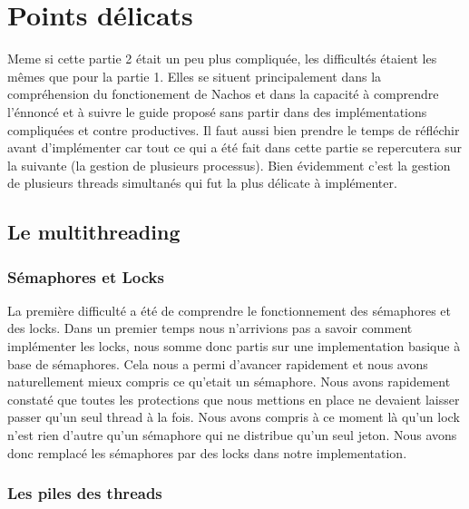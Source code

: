 \documentclass[12pt]{article}
\begin{document}
\section {Points délicats}

Meme si cette partie 2 était un peu plus compliquée, les difficultés étaient les mêmes
que pour la partie 1. Elles se situent principalement dans la compréhension du fonctionement
de Nachos et dans la capacité à comprendre l'énnoncé et à suivre le guide proposé sans
partir dans des implémentations compliquées et contre productives. Il faut aussi
bien prendre le temps de réfléchir avant d'implémenter car tout ce qui a été fait dans
cette partie se repercutera sur la suivante (la gestion de plusieurs processus).
\newline
Bien évidemment c'est la gestion de plusieurs threads simultanés qui fut la plus délicate
à implémenter.

\subsection{Le multithreading}
\subsubsection{Sémaphores et Locks}
La première difficulté a été de comprendre le fonctionnement des sémaphores et des locks.
Dans un premier temps nous n'arrivions pas a savoir comment implémenter les locks, nous somme
donc partis sur une implementation basique à base de sémaphores. Cela nous a permi d'avancer
rapidement et nous avons naturellement mieux compris ce qu'etait un sémaphore.
Nous avons rapidement constaté que toutes les protections que nous mettions en place ne
devaient laisser passer qu'un seul thread à la fois. Nous avons compris à ce moment là qu'un
lock n'est rien d'autre qu'un sémaphore qui ne distribue qu'un seul jeton.
Nous avons donc remplacé les sémaphores par des locks dans notre implementation.

\subsubsection{Les piles des threads}
\end{document}

